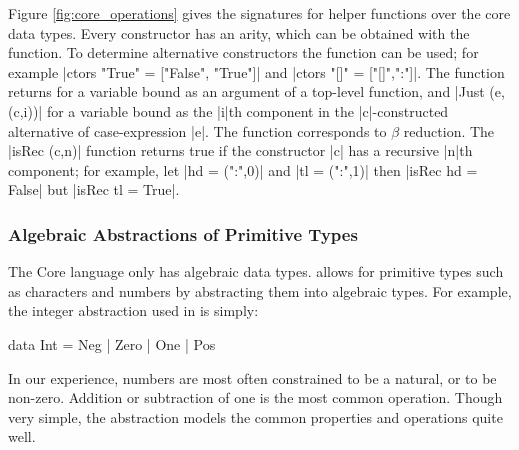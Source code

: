 Figure \ref{fig:core_operations} gives the signatures for helper functions over the core data types. Every constructor has an arity, which can be obtained with the  function. To determine alternative constructors the  function can be used; for example |ctors "True" = ["False", "True"]| and |ctors "[]" = ["[]",":"]|. The  function returns  for a variable bound as an argument of a top-level function, and |Just (e,(c,i))| for a variable bound as the |i|th component in the |c|-constructed alternative of case-expression |e|. The function  corresponds to $\beta$ reduction. The |isRec (c,n)| function returns true if the constructor |c| has a recursive |n|th component; for example, let |hd = (":",0)| and |tl = (":",1)| then |isRec hd = False| but |isRec tl = True|.

\subsubsection{Algebraic Abstractions of Primitive Types}
\label{sec:abstraction}

\begin{comment}
Natural numbers are often encoded by Peano numerals, and this idea can easily be extended to integers:

\begin{code}
data Pos  = One | Succ Pos
data Int  = Minus Pos | Zero | Plus Pos
\end{code}

Although this abstraction of \C{Int} captures all the underlying detail of the number system, the underlying constraint systems discussed in \S\ref{sec:constraint} would be unable to distinguishing between any pair of numbers both greater than 2, or both less than -2.
\end{comment}

The Core language only has algebraic data types. \catch{} allows for primitive types such as characters and numbers by abstracting them into algebraic types. For example, the integer abstraction used in \catch{} is simply:

\begin{code}
data Int = Neg | Zero | One | Pos
\end{code}

In our experience, numbers are most often constrained to be a natural, or to be non-zero. Addition or subtraction of one is the most common operation. Though very simple, the abstraction models the common properties and operations quite well.

